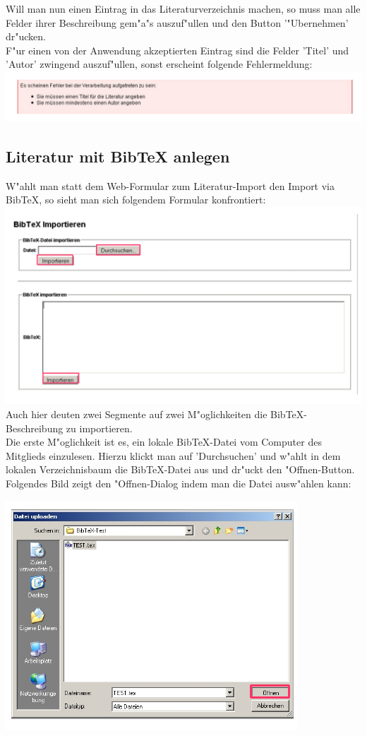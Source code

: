Will man nun einen Eintrag in das Literaturverzeichnis machen, so muss man alle Felder ihrer Beschreibung gem"a"s auszuf"ullen und den Button '"Ubernehmen' dr"ucken.\\
F"ur einen von der Anwendung akzeptierten Eintrag sind die Felder 'Titel' und 'Autor' zwingend auszuf"ullen, sonst erscheint folgende Fehlermeldung:\\
\includegraphics[scale=0.8]{err}

\subsection{Literatur mit BibTeX anlegen}
W"ahlt man statt dem Web-Formular zum Literatur-Import den Import via BibTeX, so sieht man sich folgendem Formular konfrontiert:\\
\includegraphics[scale=0.8]{bibtex}\\
Auch hier deuten zwei Segmente auf zwei M"oglichkeiten die BibTeX-Beschreibung zu importieren.\\
Die erste M"oglichkeit ist es, ein lokale BibTeX-Datei vom Computer des Mitglieds einzulesen. Hierzu klickt man auf 'Durchsuchen' und w"ahlt in dem lokalen Verzeichnisbaum die BibTeX-Datei aus und dr"uckt den "Offnen-Button. Folgendes Bild zeigt den "Offnen-Dialog indem man die Datei ausw"ahlen kann:\\
\begin{center}
\includegraphics[scale=0.8]{import1}\\
\end{center}
